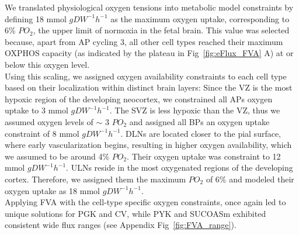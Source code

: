 We translated physiological oxygen tensions into metabolic model constraints by defining 18 mmol $gDW^{-1} h^{-1}$ as the
maximum oxygen uptake, corresponding to 6\% $PO_2$, the upper limit of normoxia in the fetal brain. This value was selected because, apart from AP cycling 3, all other cell types reached their maximum OXPHOS capacity (as indicated by the plateau in Fig~\ref{fig:eFlux_FVA} A) at or below this oxygen level. 
\\

Using this scaling, we assigned oxygen availability constraints to each cell type based on their localization within distinct brain layers:
Since the VZ is the most hypoxic region of the developing neocortex, we constrained all APs oxygen uptake to 3 mmol $gDW^{-1} h^{-1}$.
The SVZ is less hypoxic than the VZ, thus we assumed oxygen levels of $\sim$ 3 $PO_2$ and assigned all BPs an oxygen uptake constraint of 
8 mmol $gDW^{-1} h^{-1}$. DLNs are located closer to the pial surface, where early vascularization begins, 
resulting in higher oxygen availability, which we assumed to be around 4\% $PO_2$.
Their oxygen uptake was constraint to 12 mmol $gDW^{-1} h^{-1}$. ULNs reside in the most oxygenated regions of the developing cortex.
Therefore, we assigned them the maximum $PO_2$ of 6\% and modeled their oxygen uptake as 18 mmol $gDW^{-1} h^{-1}$.
\\

Applying FVA with the cell-type specific oxygen constraints, once again led to unique solutions for PGK and CV, while PYK and SUCOASm exhibited consistent wide flux ranges (see Appendix Fig~\ref{fig:FVA_range}).

